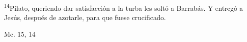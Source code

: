 \documentclass[../../rosario.tex]{subfiles}
\begin{document}
    \textsuperscript{14}Pilato, queriendo dar satisfacción a la turba les soltó a Barrabás. Y entregó a Jesús, después de azotarle, para que fuese crucificado.
    \begin{flushright}
    Mc. 15, 14
    \end{flushright}
\end{document}
